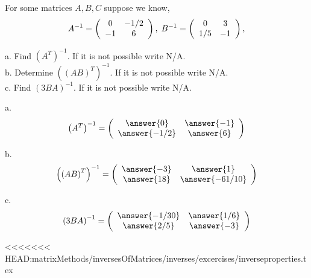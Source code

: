 \documentclass{ximera}
\author{Parisa Fatheddin}
\author{Parisa Fatheddin}
\begin{document}
\begin{exercise}
For some matrices $A, B, C$ suppose we know,
\[ A^{-1} = \left(\begin{array}{ccc}
 0 & -1/2 \\
-1 & 6
\end{array}\right), \hspace{.1cm} B^{-1} =
\left(\begin{array}{ccc}
0 & 3  \\
1/5 & -1
\end{array}\right), \]

a. Find $\left(A^{T}\right)^{-1}$. If it is not possible write N/A. \\
b. Determine $\left((AB)^{T}\right)^{-1}$. If it is not possible write N/A.\\
c. Find $\left(3BA\right)^{-1}$. If it is not possible write N/A.
\begin{prompt}
a. \[ \left(A^{T}\right)^{-1} = \left(\begin{array}{cc}
\answer{0} & \answer{-1}\\
\answer{-1/2} & \answer{6}
\end{array}\right)\]

b. \[ \left(\left(AB\right)^{T}\right)^{-1} = \left(\begin{array}{cc}
\answer{-3} & \answer{1}\\
\answer{18} & \answer{-61/10}
\end{array}\right)
\]

c. \[ \left(3BA\right)^{-1}= \left(\begin{array}{cc}
\answer{-1/30} & \answer{1/6}\\
\answer{2/5} & \answer{-3}
\end{array}\right)
\]





\end{prompt}
\end{exercise}























<<<<<<< HEAD:matrixMethods/inversesOfMatrices/inverses/excercises/inverseproperties.tex
\end{document}
